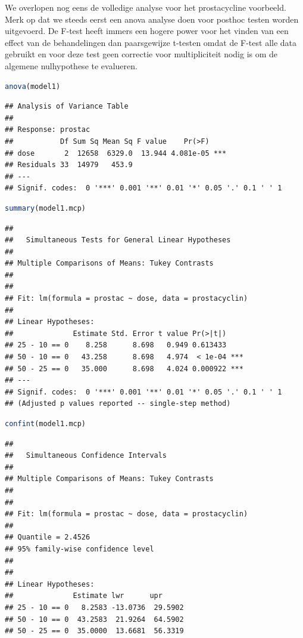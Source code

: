 \documentclass[
  12pt,dutch,coursenotes]{book}
\theoremstyle{definition}
\theoremstyle{definition}
\theoremstyle{definition}
\theoremstyle{definition}
\theoremstyle{remark}
\begin{document}
We overlopen nog eens de volledige analyse voor het prostacycline voorbeeld.
Merk op dat we steeds eerst een anova analyse doen voor posthoc testen worden uitgevoerd.
De F-test heeft immers een hogere power voor het vinden van een effect van de behandelingen dan paarsgewijze t-testen omdat de F-test alle data gebruikt en voor deze test geen correctie voor multipliciteit nodig is om de algemene nulhypothese te evalueren.

\begin{lstlisting}[language=R]
anova(model1)
\end{lstlisting}

\begin{lstlisting}
## Analysis of Variance Table
## 
## Response: prostac
##           Df Sum Sq Mean Sq F value    Pr(>F)    
## dose       2  12658  6329.0  13.944 4.081e-05 ***
## Residuals 33  14979   453.9                      
## ---
## Signif. codes:  0 '***' 0.001 '**' 0.01 '*' 0.05 '.' 0.1 ' ' 1
\end{lstlisting}

\begin{lstlisting}[language=R]
summary(model1.mcp)
\end{lstlisting}

\begin{lstlisting}
## 
##   Simultaneous Tests for General Linear Hypotheses
## 
## Multiple Comparisons of Means: Tukey Contrasts
## 
## 
## Fit: lm(formula = prostac ~ dose, data = prostacyclin)
## 
## Linear Hypotheses:
##              Estimate Std. Error t value Pr(>|t|)    
## 25 - 10 == 0    8.258      8.698   0.949 0.613433    
## 50 - 10 == 0   43.258      8.698   4.974  < 1e-04 ***
## 50 - 25 == 0   35.000      8.698   4.024 0.000922 ***
## ---
## Signif. codes:  0 '***' 0.001 '**' 0.01 '*' 0.05 '.' 0.1 ' ' 1
## (Adjusted p values reported -- single-step method)
\end{lstlisting}

\begin{lstlisting}[language=R]
confint(model1.mcp)
\end{lstlisting}

\begin{lstlisting}
## 
##   Simultaneous Confidence Intervals
## 
## Multiple Comparisons of Means: Tukey Contrasts
## 
## 
## Fit: lm(formula = prostac ~ dose, data = prostacyclin)
## 
## Quantile = 2.4526
## 95% family-wise confidence level
##  
## 
## Linear Hypotheses:
##              Estimate lwr      upr     
## 25 - 10 == 0   8.2583 -13.0736  29.5902
## 50 - 10 == 0  43.2583  21.9264  64.5902
## 50 - 25 == 0  35.0000  13.6681  56.3319
\end{lstlisting}
\end{document}

